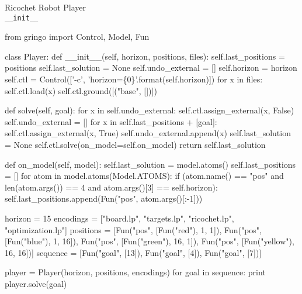 \begin{frame}[fragile]{Ricochet Robot Player\\[-5pt]\large\texttt{\_\_init\_\_}}
\Tiny\vspace{-15pt}
\begin{semiverbatim}
from gringo import Control, Model, Fun

class Player:
\alert{    def __init__(self, horizon, positions, files):
        self.last_positions = positions
        self.last_solution = None
        self.undo_external = []
        self.horizon = horizon
        self.ctl = Control(['-c', 'horizon=\{0\}'.format(self.horizon)])
        for x in files:
            self.ctl.load(x)
        self.ctl.ground([("base", [])])}

    def solve(self, goal):
        for x in self.undo_external:
            self.ctl.assign_external(x, False)
        self.undo_external = []
        for x in self.last_positions + [goal]:
            self.ctl.assign_external(x, True)
            self.undo_external.append(x)
        self.last_solution = None
        self.ctl.solve(on_model=self.on_model)
        return self.last_solution

    def on_model(self, model):
        self.last_solution = model.atoms()
        self.last_positions = []
        for atom in model.atoms(Model.ATOMS):
            if (atom.name() == "pos" and len(atom.args()) == 4 and atom.args()[3] == self.horizon):
                self.last_positions.append(Fun("pos", atom.args()[:-1]))

horizon   = 15
encodings = ["board.lp", "targets.lp", "ricochet.lp", "optimization.lp"]
positions = [Fun("pos", [Fun("red"),     1,  1]), Fun("pos", [Fun("blue"),    1, 16]),
             Fun("pos", [Fun("green"),  16,  1]), Fun("pos", [Fun("yellow"), 16, 16])]
sequence  = [Fun("goal", [13]), Fun("goal", [4]), Fun("goal", [7])]

player = Player(horizon, positions, encodings)
for goal in sequence:
    print player.solve(goal)
\end{semiverbatim}
\end{frame}
